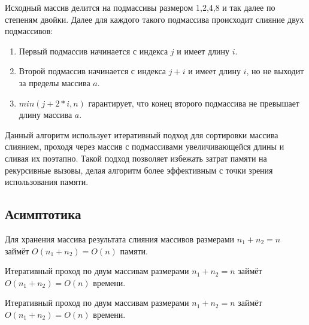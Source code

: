 \begin{algorithmic}[1]
                \State {}
            \EndFor
        \EndFor
    \EndFunction
\end{algorithmic}


Исходный массив делится на подмассивы размером 1,2,4,8 и так далее по степеням двойки.
Далее для каждого такого подмассива происходит слияние двух подмассивов:
\begin{enumerate}
    \item Первый подмассив начинается с индекса $j$ и имеет длину $i$.
    \item  Второй подмассив начинается с индекса $j + i$ и имеет длину $i$, но не выходит за пределы массива $a$.
    \item $min(j + 2 * i, n)$ гарантирует, что конец второго подмассива не превышает длину массива $a$.
\end{enumerate}

Данный алгоритм использует итеративный подход для сортировки массива слиянием, проходя через массив с подмассивами увеличивающейся длины и сливая их поэтапно. Такой подход позволяет избежать затрат памяти на рекурсивные вызовы, делая алгоритм более эффективным с точки зрения использования памяти.

\subsection{Асимптотика}

\begin{theorem}

    Для хранения массива результата слияния массивов размерами $n_1 + n_2 = n$ займёт $O(n_1+n_2)=O(n)$ памяти.

\end{theorem}

\begin{theorem}

    Итеративный проход по двум массивам размерами $n_1 + n_2 = n$ займёт $O(n_1+n_2)=O(n)$ времени.

\end{theorem}



\begin{theorem}

    Итеративный проход по двум массивам размерами $n_1 + n_2 = n$ займёт $O(n_1+n_2)=O(n)$ времени.

\end{theorem}


